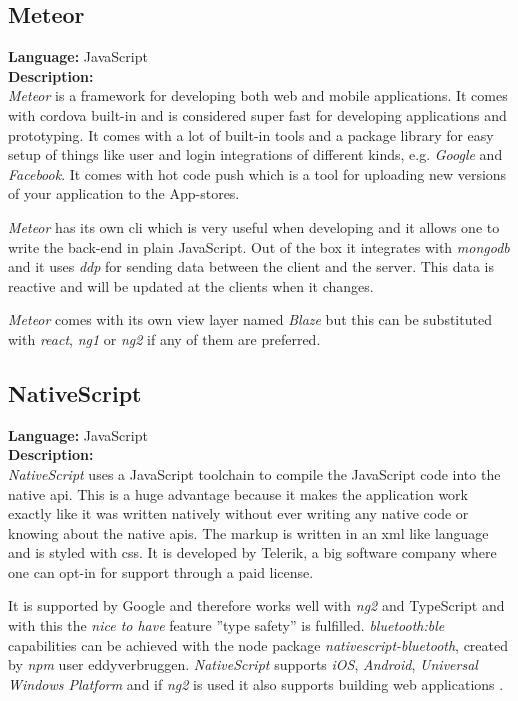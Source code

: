 \subsection*{Meteor}
\textbf{Language:} JavaScript
\\
\textbf{Description:}
\\
\textit{Meteor} is a framework for developing both web and mobile applications. 
It comes with \gls{cordova} built-in and is considered super fast for developing applications and prototyping. 
It comes with a lot of built-in tools and a package library for easy setup of things like user  and login integrations of different kinds, e.g. \textit{Google} and \textit{Facebook}. It comes with hot code push which is a tool for uploading new versions of your application to the App-stores.

\textit{Meteor} has its own \gls{cli} which is very useful when developing and it allows one to write the back-end in plain JavaScript. 
Out of the box it integrates with \textit{\gls{mongodb}} and it uses \textit{\gls{ddp}} for sending data between the client and the server. 
This data is reactive and will be updated at the clients when it changes.

\textit{Meteor} comes with its own view layer named \textit{Blaze} but this can be substituted with \textit{\gls{react}}, \textit{\gls{ng1}} or \textit{\gls{ng2}} if any of them are preferred.

\subsection*{NativeScript}
\textbf{Language:} JavaScript
\\
\textbf{Description:}
\\
\textit{NativeScript} uses a JavaScript toolchain to compile the JavaScript code into the native \gls{api}. 
This is a huge advantage because it makes the application work exactly like it was written natively without ever writing any native code or knowing about the native \glspl{api}. 
The markup is written in an \gls{xml} like language and is styled with \gls{css}.
It is developed by Telerik, a big software company where one can opt-in for support through a paid license. 

It is supported by Google and therefore works well with \textit{\gls{ng2}} and TypeScript and with this the \textit{nice to have} feature ''type safety'' is fulfilled. 
\textit{\gls{bluetooth:ble}} capabilities can be achieved with the \gls{node} package \textit{nativescript-bluetooth}, created by \textit{npm} user eddyverbruggen. 
\textit{NativeScript} supports \textit{iOS}, \textit{Android}, \textit{Universal Windows Platform} and if \textit{\gls{ng2}} is used it also supports building web applications \citep{preStudy:frameworks:nativescript}.


